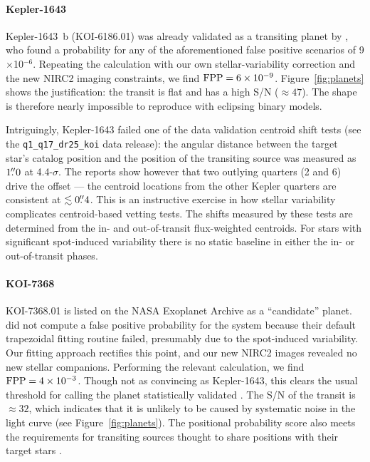 \documentclass[12pt,twocolumn]{aastex63}
\begin{document}
\paragraph{Kepler-1643}
Kepler-1643~b (KOI-6186.01) was already validated as a transiting
planet by \citet{morton_false_2016}, who found a probability for any
of the aforementioned false positive scenarios of 9$\times$10$^{-6}$.
Repeating the calculation with our own stellar-variability correction
and the new NIRC2 imaging constraints, we find ${\rm FPP} =
6\times10^{-9}$.  Figure~\ref{fig:planets} shows the justification:
the transit is flat and has a high S/N ($\approx$$47$).  The shape is
therefore nearly impossible to reproduce with eclipsing binary models.

Intriguingly, Kepler-1643 failed one of the data validation
centroid shift tests (see the \texttt{q1\_q17\_dr25\_koi} data
release): the angular distance between the target star's catalog
position and the position of the transiting source was measured as
$1\mbox{$.\!\!^{\prime\prime}$}0$ at 4.4-$\sigma$.  The reports show however that two
outlying quarters (2 and 6) drive the offset --- the centroid locations
from the other Kepler quarters are consistent at $\lesssim 0\mbox{$.\!\!^{\prime\prime}$}4$.
This is an instructive exercise in how stellar
variability complicates centroid-based vetting tests.  The 
shifts measured by these tests are determined from the in- and
out-of-transit flux-weighted centroids.  For stars with significant
spot-induced variability there is no static baseline in either the in-
or out-of-transit phases.

\paragraph{KOI-7368}
KOI-7368.01 is listed on the NASA Exoplanet Archive as a ``candidate''
planet.  \citet{morton_false_2016} did not compute a false positive
probability for the system because their default trapezoidal fitting
routine failed, presumably due to the spot-induced variability.  Our
fitting approach rectifies this point, and our new NIRC2 images
revealed no new stellar companions.  Performing the relevant
calculation, we find ${\rm FPP} = 4\times10^{-3}$.  Though not
as convincing as Kepler-1643, this clears the usual threshold
for calling the planet statistically validated
\citep{morton_efficient_2012}.  The S/N of the transit is
$\approx$$32$, which indicates that it is unlikely to be caused by
systematic noise in the light curve (see Figure~\ref{fig:planets}).
The positional probability score also meets the requirements for
transiting sources thought to share positions with their target stars
\citep{2017ksci.rept...16B}. 
\end{document}
